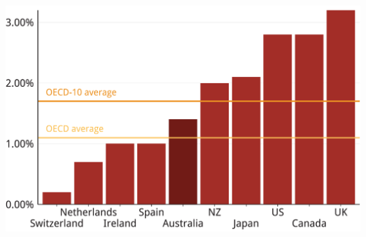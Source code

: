 \documentclass[tikz]{standalone}\usepackage[]{graphicx}\usepackage[]{color}
\newenvironment{knitrout}{}{} %
\begin{document}
\begin{knitrout}
\color{fgcolor}
\includegraphics[width=11.000in,height=7.00in]{./Property-taxes/atlas/figure/PROP-Figure1-1} 

\end{knitrout}
\end{document}
